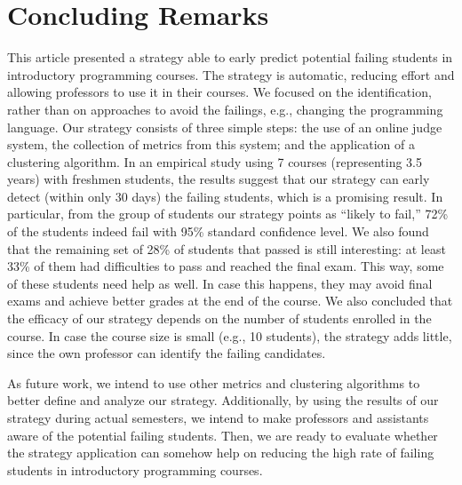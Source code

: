 \section{Concluding Remarks}

\label{sec:conclusion}

This article presented a strategy able to early predict potential failing students in introductory programming courses. The strategy is automatic, reducing effort and allowing professors to use it in their courses. We focused on the identification, rather than on approaches to avoid the failings, e.g., changing the programming language. Our strategy consists of three simple steps: the use of an online judge system, the collection of metrics from this system; and the application of a clustering algorithm. In an empirical study using 7 courses (representing 3.5 years) with freshmen students, the results suggest that our strategy can early detect (within only 30 days) the failing students, which is a promising result. In particular, from the group of students our strategy points as ``likely to fail,'' 72\% of the students indeed fail with 95\% standard confidence level. We also found that the remaining set of 28\% of students that passed is still interesting: at least 33\% of them had difficulties to pass and reached the final exam. This way, some of these students need help as well. In case this happens, they may avoid final exams and achieve better grades at the end of the course. We also concluded that the efficacy of our strategy depends on the number of students enrolled in the course. In case the course size is small (e.g., 10 students), the strategy adds little, since the own professor can identify the failing candidates.

As future work, we intend to use other metrics and clustering algorithms to better define and analyze our strategy. Additionally, by using the results of our strategy during actual semesters, we intend to make professors and assistants aware of the potential failing students. Then, we are ready to evaluate whether the strategy application can somehow help on reducing the high rate of failing students in introductory programming courses.